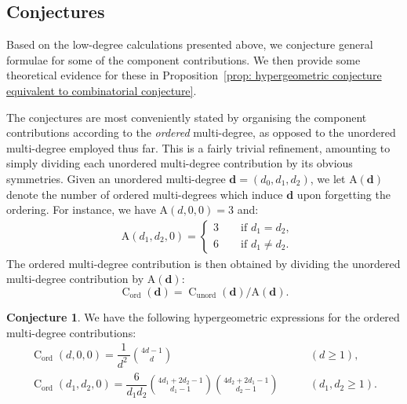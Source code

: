 \documentclass[11pt]{amsart}
\theoremstyle{definition}
\theoremstyle{definition}
\newtheorem{conjecture}[theorem]{Conjecture}
\begin{document}
\subsection{Conjectures}\label{sec: conjectures} \label{sec: hypergeometric formulae} Based on the low-degree calculations presented above, we conjecture general formulae for some of the component contributions. We then provide some theoretical evidence for these in Proposition~\ref{prop: hypergeometric conjecture equivalent to combinatorial conjecture}.

The conjectures are most conveniently stated by organising the component contributions according to the \emph{ordered} multi-degree, as opposed to the unordered multi-degree employed thus far. This is a fairly trivial refinement, amounting to simply dividing each unordered multi-degree contribution by its obvious symmetries. Given an unordered multi-degree $\mathbf{d}=(d_0,d_1,d_2)$, we let $\mathrm{A}(\mathbf{d})$ denote the number of ordered multi-degrees which induce $\mathbf{d}$ upon forgetting the ordering. For instance, we have $\mathrm{A}(d,0,0) = 3$ and:
\begin{align*}
& \mathrm{A}(d_1,d_2,0) = \begin{cases} 3 \qquad \text{if } d_1=d_2, \\ 6 \qquad \text{if } d_1 \neq d_2.\end{cases}
\end{align*}
The ordered multi-degree contribution is then obtained by dividing the unordered multi-degree contribution by $\mathrm{A}(\mathbf{d})$:
\begin{equation*} \operatorname{C}_{\operatorname{ord}}(\mathbf{d}) =  \operatorname{C}_{\operatorname{unord}}(\mathbf{d})/\mathrm{A}(\mathbf{d}).\end{equation*}

\begin{conjecture} \label{conj: hypergeometric conjecture} We have the following hypergeometric expressions for the ordered multi-degree contributions:
\begin{align} \label{eqn: multi-degree d hypergeometric conjecture}\operatorname{C}_{\operatorname{ord}}(d,0,0) = \dfrac{1}{d^2\ } {4d-1 \choose d} \qquad & (d \geq 1), \\[8pt]
\label{eqn: degree d1 d2 conjecture} \operatorname{C}_{\operatorname{ord}}(d_1,d_2,0) = \dfrac{6}{d_1 d_2} {4d_1+2d_2-1 \choose d_1 - 1} {4d_2 + 2d_1 - 1 \choose d_2 - 1} \qquad & (d_1,d_2\geq 1).
\end{align}
\end{conjecture}
\end{document}
